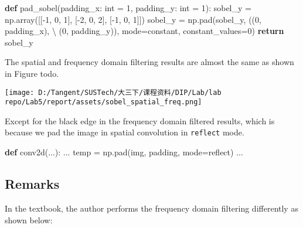 \documentclass[
]{article}
\newenvironment{Shaded}{}{}
\newcommand{\BuiltInTok}[1]{\textcolor[rgb]{0.00,0.50,0.00}{#1}}
\newcommand{\ControlFlowTok}[1]{\textcolor[rgb]{0.00,0.44,0.13}{\textbf{#1}}}
\newcommand{\DecValTok}[1]{\textcolor[rgb]{0.25,0.63,0.44}{#1}}
\newcommand{\KeywordTok}[1]{\textcolor[rgb]{0.00,0.44,0.13}{\textbf{#1}}}
\newcommand{\NormalTok}[1]{#1}
\newcommand{\OperatorTok}[1]{\textcolor[rgb]{0.40,0.40,0.40}{#1}}
\newcommand{\StringTok}[1]{\textcolor[rgb]{0.25,0.44,0.63}{#1}}
\begin{document}
\begin{Shaded}
\begin{Highlighting}[]
\KeywordTok{def}\NormalTok{ pad\_sobel(padding\_x: }\BuiltInTok{int} \OperatorTok{=} \DecValTok{1}\NormalTok{, padding\_y: }\BuiltInTok{int} \OperatorTok{=} \DecValTok{1}\NormalTok{):}
\NormalTok{    sobel\_y }\OperatorTok{=}\NormalTok{ np.array([[}\OperatorTok{{-}}\DecValTok{1}\NormalTok{, }\DecValTok{0}\NormalTok{, }\DecValTok{1}\NormalTok{], [}\OperatorTok{{-}}\DecValTok{2}\NormalTok{, }\DecValTok{0}\NormalTok{, }\DecValTok{2}\NormalTok{], [}\OperatorTok{{-}}\DecValTok{1}\NormalTok{, }\DecValTok{0}\NormalTok{, }\DecValTok{1}\NormalTok{]])}
\NormalTok{    sobel\_y }\OperatorTok{=}\NormalTok{ np.pad(sobel\_y, ((}\DecValTok{0}\NormalTok{, padding\_x), }\OperatorTok{\textbackslash{}}
\NormalTok{                    (}\DecValTok{0}\NormalTok{, padding\_y)), mode}\OperatorTok{=}\StringTok{\textquotesingle{}constant\textquotesingle{}}\NormalTok{, constant\_values}\OperatorTok{=}\DecValTok{0}\NormalTok{)}
    \ControlFlowTok{return}\NormalTok{ sobel\_y}
\end{Highlighting}
\end{Shaded}

The spatial and frequency domain filtering results are almost the same
as shown in Figure todo.

\texttt{[image: D:/Tangent/SUSTech/大三下/课程资料/DIP/Lab/lab repo/Lab5/report/assets/sobel\_spatial\_freq.png]}

Except for the black edge in the frequency domain filtered results,
which is because we pad the image in spatial convolution in
\texttt{reflect} mode.

\begin{Shaded}
\begin{Highlighting}[]
\KeywordTok{def}\NormalTok{ conv2d(...):}
\NormalTok{    ...}
\NormalTok{	temp }\OperatorTok{=}\NormalTok{ np.pad(img, padding, mode}\OperatorTok{=}\StringTok{\textquotesingle{}reflect\textquotesingle{}}\NormalTok{)}
\NormalTok{	...}
\end{Highlighting}
\end{Shaded}

\hypertarget{remarks}{%
\subsection{Remarks}\label{remarks}}

In the textbook, the author performs the frequency domain filtering
differently as shown below:
\end{document}
